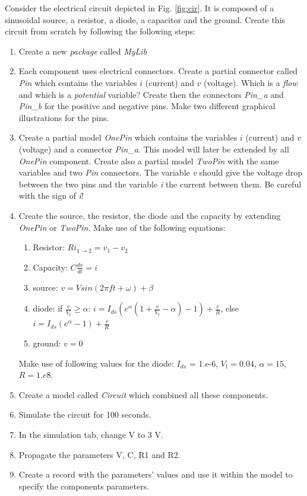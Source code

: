 \documentclass[10pt,a4paper]{article}
\begin{document}
Consider the electrical circuit depicted in Fig. \ref{fig:cir}. It is composed of a sinusoidal source, a resistor, a diode, a capacitor and the ground. Create this circuit from scratch by following the following steps:


\begin{enumerate}
\item Create a new \textit{package} called \textit{MyLib}
\item Each component uses electrical connectors. Create a partial connector called \textit{Pin} which contains the variables $i$ (current) and $v$ (voltage). Which is a \textit{flow} and which is a \textit{potential} variable? Create then the connectors \textit{Pin\_a} and \textit{Pin\_b} for the positive and negative pins. Make two different graphical illustrations for the pins.
\item Create a partial model \textit{OnePin} which contains the variables $i$ (current) and $v$ (voltage) and a connector \textit{Pin\_a}. This model will later be extended by all \textit{OnePin} component. Create also a partial model \textit{TwoPin} with the same variables and two \textit{Pin} connectors. The variable \textit{v} should give the voltage drop between the two pins and the variable \textit{i} the current between them. Be careful with the sign of \textit{i}!
\item Create the source, the resistor, the diode and the capacity by extending \textit{OnePin} or \textit{TwoPin}. Make use of the following equations:
\begin{enumerate}
\item Resistor: $R i_{1 \rightarrow 2} = v_1 - v_2$
\item Capacity: $C \frac{d v}{dt} = i$
\item source: $v = V sin( 2 \pi f t + \omega) + \beta$
\item diode: if $ \frac{v}{V_t} \geq \alpha$: $i = I_{ds} ( e^\alpha ( 1 + \frac{v}{V_t} - \alpha) - 1) + \frac{v}{R}$, else $i = I_{ds} (e^\alpha - 1) + \frac{v}{R}$
\item ground: $ v = 0$
\end{enumerate}
Make use of following values for the diode: $I_{ds}$ = 1.e-6, $V_t=0.04$, $\alpha=15$, $R=1.e8$.
\item Create a model called \textit{Circuit} which combined all these components.
\item Simulate the circuit for 100 seconds.
\item In the simulation tab, change V to 3 V.
\item Propagate the parameters V, C, R1 and R2.
\item Create a record with the parameters' values and use it within the model to specify the components parameters.
\end{enumerate}
\end{document}

